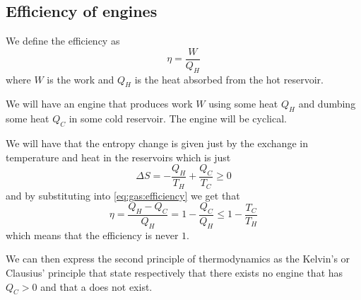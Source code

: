 \documentclass[12pt]{extarticle}
\begin{document}
\subsection{Efficiency of engines}

We define the efficiency as
\begin{equation}
    \label{eq:gas:efficiency}
    \eta = \frac{W}{Q_H}
\end{equation}
where $W$ is the work and $Q_H$ is the heat absorbed from the hot reservoir.

We will have an engine that produces work $W$ using some heat $Q_H$ and dumbing some heat $Q_C$ in some cold reservoir.
The engine will be cyclical.

We will have that the entropy change is given just by the exchange in temperature and heat in the reservoirs which is just
\begin{equation}
    \Delta S = - \frac{Q_H}{T_H} + \frac{Q_C}{T_C} \geq 0
\end{equation}
and by substituting into \autoref{eq:gas:efficiency} we get that
\begin{equation}
    \eta = \frac{Q_H - Q_C}{Q_H} = 1 - \frac{Q_C}{Q_H} \leq 1 - \frac{T_C}{T_H}
\end{equation}
which means that the efficiency is never $1$.

We can then express the second principle of thermodynamics as the Kelvin's or Clausius' principle that state respectively that there exists no engine that has $Q_C > 0$ and that a  does not exist.
\end{document}
